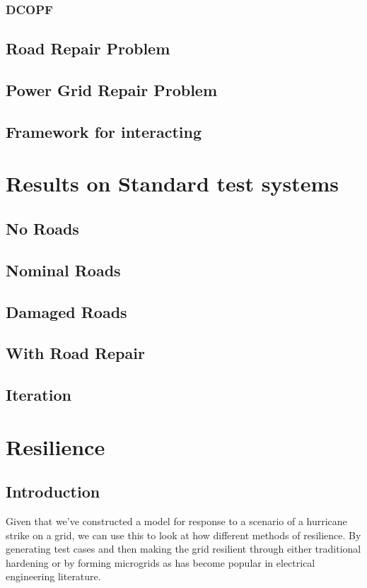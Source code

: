 \documentclass{article}
\begin{document}
	\subsubsection{DCOPF}
	
	\subsection{Road Repair Problem}
	\subsection{Power Grid Repair Problem}
	\subsection{Framework for interacting}
	\section{Results on Standard test systems}
	\subsection{No Roads}
	\subsection{Nominal Roads}
	\subsection{Damaged Roads}
	\subsection{With Road Repair}
	\subsection{Iteration}
	\section{Resilience}
	\subsection{Introduction}
	Given that we've constructed a model for response to a scenario of a hurricane strike on a grid, we can use this to look at how different methods of resilience. By generating test cases and then making the grid resilient through either traditional hardening or by forming microgrids as has become popular in electrical engineering literature.
\end{document}

